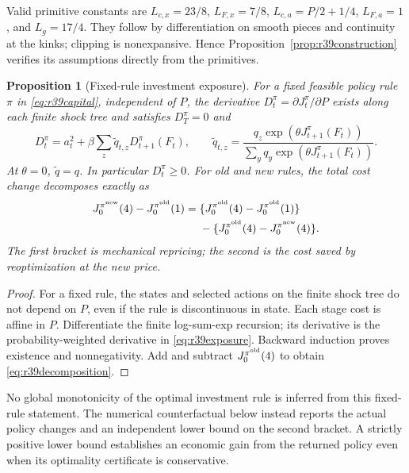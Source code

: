 \documentclass[ecta,nameyear,draft]{econsocart}
\newtheorem{proposition}[theorem]{Proposition}
\theoremstyle{definition}
\theoremstyle{remark}
\begin{document}
Valid primitive constants are $L_{c,x}=23/8$, $L_{F,x}=7/8$,
$L_{c,a}=P/2+1/4$, $L_{F,a}=1$, and $L_g=17/4$.
They follow by differentiation on smooth pieces and continuity at the kinks;
clipping is nonexpansive. Hence Proposition~\ref{prop:r39construction}
verifies its assumptions directly from the primitives.

\begin{proposition}[Fixed-rule investment exposure]\label{prop:r39exposure}
For a fixed feasible policy rule $\pi$ in \eqref{eq:r39capital}, independent of
$P$, the derivative $D_t^\pi=\partial J_t^\pi/\partial P$ exists along each
finite shock tree and satisfies $D_T^\pi=0$ and
\begin{equation}\label{eq:r39exposure}
 D_t^\pi=a_t^2+\beta\sum_z\widetilde q_{t,z}D_{t+1}^\pi(F_t),\qquad
 \widetilde q_{t,z}=
 \frac{q_z\exp(\theta J_{t+1}^\pi(F_t))}
      {\sum_yq_y\exp(\theta J_{t+1}^\pi(F_t))}.
\end{equation}
At $\theta=0$, $\widetilde q=q$. In particular $D_t^\pi\geq0$.
For old and new rules, the total cost change decomposes exactly as
\begin{align}\label{eq:r39decomposition}
 J_0^{\pi^{\rm new}}(4)-J_0^{\pi^{\rm old}}(1)
 ={}&\{J_0^{\pi^{\rm old}}(4)-J_0^{\pi^{\rm old}}(1)\}\\
 &-\{J_0^{\pi^{\rm old}}(4)-J_0^{\pi^{\rm new}}(4)\}.\nonumber
\end{align}
The first bracket is mechanical repricing; the second is the cost saved by
reoptimization at the new price.
\end{proposition}
\begin{proof}
For a fixed rule, the states and selected actions on the finite shock tree do
not depend on $P$, even if the rule is discontinuous in state. Each stage cost
is affine in $P$. Differentiate the finite log-sum-exp recursion; its derivative
is the probability-weighted derivative in \eqref{eq:r39exposure}. Backward
induction proves existence and nonnegativity. Add and subtract
$J_0^{\pi^{\rm old}}(4)$ to obtain \eqref{eq:r39decomposition}.
\end{proof}

No global monotonicity of the optimal investment rule is inferred from this
fixed-rule statement. The numerical counterfactual below instead reports the
actual policy changes and an independent lower bound on the second bracket.
A strictly positive lower bound establishes an economic gain from the returned
policy even when its optimality certificate is conservative.
\end{document}
